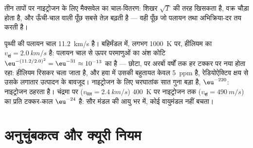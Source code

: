 \begin{omfigure}

{\small तीन तापों पर नाइट्रोजन के लिए मैक्सवेल का चाल-वितरण:
शिखर $\sqrt T$ की तरह खिसकता है, वक्र चौड़ा होता है, और
ऊँची-चाल वाली पूँछ सबसे तेज़ बढ़ती है --- वही पूँछ जो पलायन
तथा अभिक्रिया-दर तय करती है।}
\end{omfigure}

\begin{example}[ग्रह कौन छोड़ता है]\label{ex:b2:boltzmann-factor:escape}
पृथ्वी की पलायन चाल \qty{11.2}{km/s} है। बहिर्मंडल में, लगभग
\qty{1000}{K} पर, हीलियम का $v_{\text{सं}} = \qty{2.0}{km/s}$ है: पलायन चाल से ऊपर
परमाणुओं का अंश कोटि $\eu^{-(11.2/2.0)^2} = \eu^{-31}
\approx 10^{-13}$ का है --- छोटा, पर अरबों वर्षों तक हर टक्कर पर नया
होता रहा: हीलियम रिसकर चला जाता है, और हवा में उसकी बहुतायत केवल
\qty{5}{ppm} है, रेडियोऐक्टिव क्षय से उसके लगातार उत्पादन के बावजूद।
नाइट्रोजन के लिए चरघातांक सात गुना बड़ा है, $\eu^{-220}$: नाइट्रोजन ठहरता है।
चंद्रमा पर ($v_{\text{पल}} = \qty{2.4}{km/s}$) \qty{400}{K} पर नाइट्रोजन तक
($v_{\text{सं}} = \qty{490}{m/s}$) का प्रति टक्कर-काल $\eu^{-24}$ है:
सौर मंडल की आयु भर में, कोई वायुमंडल नहीं बचता।
\end{example}

\section{अनुचुंबकत्व और क्यूरी नियम}


